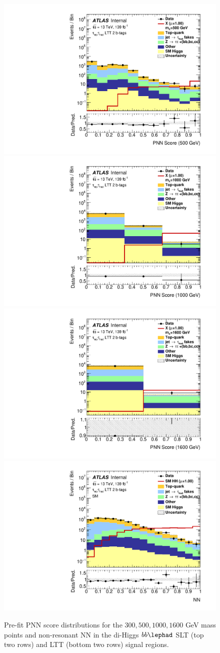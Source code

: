 \begin{figure}
\includegraphics[width=.32\textwidth]{figures/mva/HH/LepHad/LTT/Region_BMin0_incJet1_dist500_J2_D2HDMPNN_T2_SpcTauLH_Y2015_LTT1_L1_Prefitlog.pdf}
\includegraphics[width=.32\textwidth]{figures/mva/HH/LepHad/LTT/Region_BMin0_incJet1_dist1000_J2_D2HDMPNN_T2_SpcTauLH_Y2015_LTT1_L1_Prefitlog.pdf} \\
\includegraphics[width=.32\textwidth]{figures/mva/HH/LepHad/LTT/Region_BMin0_incJet1_dist1600_J2_D2HDMPNN_T2_SpcTauLH_Y2015_LTT1_L1_Prefitlog.pdf} 
\includegraphics[width=.32\textwidth]{figures/mva/HH/LepHad/LTT/Region_BMin0_incJet1_distNN_J2_DSM_T2_SpcTauLH_Y2015_LTT1_L1_Prefitlog.pdf}
\caption{Pre-fit PNN score distributions for the $300, 500, 1000, 1600$ GeV mass points and non-resonant NN in the di-Higgs $bb\lephad$ SLT (top two rows) and LTT (bottom two rows) signal regions.}
\label{fig:lephadmvaoutput}
\end{figure}


